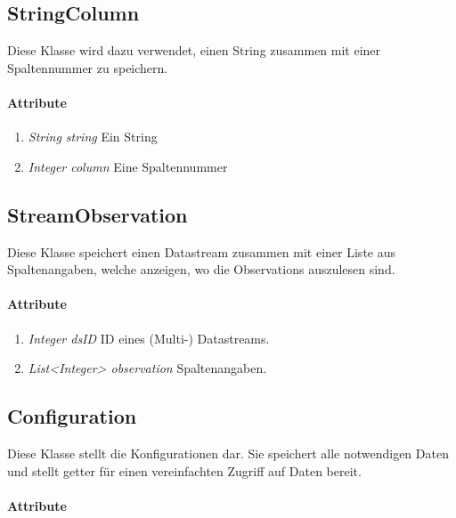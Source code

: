 \subsection{StringColumn}
Diese Klasse wird dazu verwendet, einen String zusammen mit einer Spaltennummer zu speichern.
\paragraph{Attribute}
\begin{enumerate}[-]
	\item \textit{String string} Ein String
	\item \textit{Integer column} Eine Spaltennummer
\end{enumerate} 

\subsection{StreamObservation}
Diese Klasse speichert einen Datastream zusammen mit einer Liste aus Spaltenangaben, welche anzeigen, wo die Observations auszulesen sind.
\paragraph{Attribute} 
\begin{enumerate}[-]
	\item \textit{Integer dsID} ID eines (Multi-) Datastreams. 
	\item \textit{List<Integer> observation} Spaltenangaben.
\end{enumerate}

\subsection{Configuration}
Diese Klasse stellt die Konfigurationen dar. 
Sie speichert alle notwendigen Daten und stellt getter für einen vereinfachten Zugriff auf Daten bereit.

\paragraph{Attribute}

